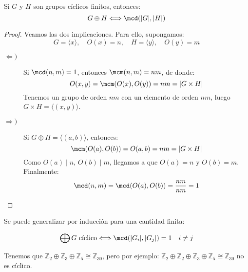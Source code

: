 \begin{prop}
    Si $G$ y $H$ son grupos cíclicos finitos, entonces:
    \begin{equation*}
        G\oplus H \Longleftrightarrow \mcd(|G|,|H|)
    \end{equation*}
    \begin{proof}
        Veamos las dos implicaciones. Para ello, supongamos:
        \begin{equation*}
            G = \langle x \rangle,  \quad O(x) = n, \quad H = \langle y \rangle , \quad O(y) = m
        \end{equation*}
        \begin{description}
            \item [$\Longleftarrow)$] Si $\mcd(n,m) = 1$, entonces $\mcm(n,m) = nm$, de donde:
                \begin{equation*}
                    O(x,y) = \mcm(O(x), O(y)) = nm = |G\times H|
                \end{equation*}
                Tenemos un grupo de orden $nm$ con un elemento de orden $nm$, luego $G\times H = \langle (x,y) \rangle $.
            \item [$\Longrightarrow)$] Si $G\oplus H = \langle (a,b) \rangle $, entonces:
                \begin{equation*}
                    \mcm(O(a), O(b)) = O(a,b) = nm = |G\times H|
                \end{equation*}
                Como $O(a) \mid n$, $O(b) \mid m$, llegamos a que $O(a) = n$ y $O(b) = m$. Finalmente:
                \begin{equation*}
                    \mcd(n,m) = \mcd(O(a),O(b)) = \dfrac{nm}{nm} = 1
                \end{equation*}
        \end{description}
    \end{proof}
\end{prop}

Se puede generalizar por inducción para una cantidad finita:
\begin{prop}
    \begin{equation*}
        \bigoplus G \text{\ cíclico} \Longleftrightarrow \mcd(|G_i|,|G_j|) = 1 \quad i\neq j
    \end{equation*}
\end{prop}

\begin{ejemplo}
    Tenemos que $\mathbb{Z}_2\oplus\mathbb{Z}_3\oplus\mathbb{Z}_5 \cong \mathbb{Z}_{30}$, pero por ejemplo:
    $\mathbb{Z}_2\oplus\mathbb{Z}_2\oplus\mathbb{Z}_3\oplus\mathbb{Z}_5 \cong \mathbb{Z}_{30}$ no es cíclico.
\end{ejemplo}

